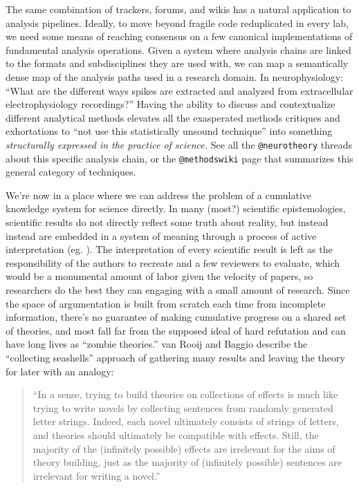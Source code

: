 \documentclass[notoc]{tufte-book}
\begin{document}
The same combination of trackers, forums, and wikis has a natural
application to analysis pipelines. Ideally, to move beyond fragile code
reduplicated in every lab, we need some means of reaching consensus on a
few canonical implementations of fundamental analysis operations. Given
a system where analysis chains are linked to the formats and
subdisciplines they are used with, we can map a semantically dense map
of the analysis paths used in a research domain. In neurophysiology:
``What are the different ways spikes are extracted and analyzed from
extracellular electrophysiology recordings?'' Having the ability to
discuss and contextualize different analytical methods elevates all the
exasperated methods critiques and exhortations to ``not use this
statistically unsound technique'' into something \emph{structurally
expressed in the practice of science.} See all the \texttt{@neurotheory}
threads about this specific analysis chain, or the \texttt{@methodswiki}
page that summarizes this general category of techniques.

We're now in a place where we can address the problem of a cumulative
knowledge system for science directly. In many (most?) scientific
epistemologies, scientific results do not directly reflect some truth
about reality, but instead instead are embedded in a system of meaning
through a process of active interpretation (eg. \citep{meehlTheoreticalRisksTabular1978} ). The interpretation of every
scientific result is left as the responsibility of the authors to
recreate and a few reviewers to evaluate, which would be a monumental
amount of labor given the velocity of papers, so researchers do the best
they can engaging with a small amount of research. Since the space of
argumentation is built from scratch each time from incomplete
information, there's no guarantee of making cumulative progress on a
shared set of theories, and most fall far from the supposed ideal of
hard refutation and can have long lives as ``zombie theories.'' van
Rooij and Baggio describe the ``collecting seashells'' approach of
gathering many results and leaving the theory for later with an analogy:

\begin{quote}
``In a sense, trying to build theories on collections of effects is much
like trying to write novels by collecting sentences from randomly
generated letter strings. Indeed, each novel ultimately consists of
strings of letters, and theories should ultimately be compatible with
effects. Still, the majority of the (infinitely possible) effects are
irrelevant for the aims of theory building, just as the majority of
(infinitely possible) sentences are irrelevant for writing a novel.''
\citep{vanrooijTheoryTestHow2021} 
\end{quote}
\end{document}
